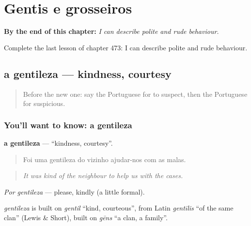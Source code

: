 
\chapter{Gentis e grosseiros}
\label{ch:pt-gentis-e-grosseiros}

\begin{chapteropening}
\textbf{By the end of this chapter:} \emph{I can describe polite and rude behaviour.}

Complete the last lesson of chapter 473: I can describe polite and rude behaviour.
\end{chapteropening}

\section[a gentileza]{a gentileza — kindness, courtesy}

\label{lesson:PT-C473-gentileza}



\begin{quote}
Before the new one: say the Portuguese for to suspect, then the Portuguese for suspicious.
\end{quote}

\subsection*{You'll want to know: a gentileza}
\textbf{a gentileza} — \textquotedblleft{}kindness, courtesy\textquotedblright{}.

\begin{quote}
Foi uma gentileza do vizinho ajudar-nos com as malas.
\end{quote}

\begin{quote}
\emph{It was kind of the neighbour to help us with the cases.}
\end{quote}

\emph{Por gentileza} — please, kindly (a little formal).

\begin{cousinweb}
\emph{gentileza} is built on \emph{gentil} \textquotedblleft{}kind, courteous\textquotedblright{}, from Latin \emph{gentīlis} \textquotedblleft{}of the same clan\textquotedblright{} (Lewis \& Short), built on \emph{gēns} \textquotedblleft{}a clan, a family\textquotedblright{}.
\end{cousinweb}

